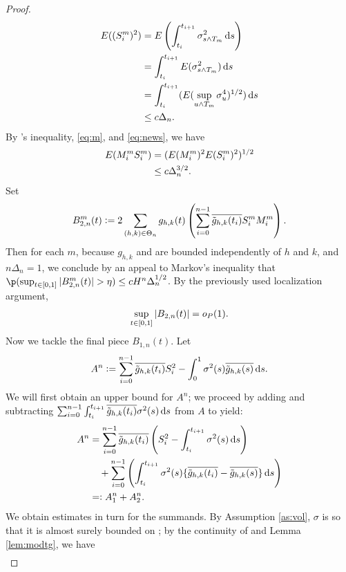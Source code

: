 \begin{proof}
\begin{align}
  E((S_i^m)^2)   & = E\left(\int_{t_i}^{t_{i+1}} \sigma^2_{s \wedge T_m} \D s \right)\notag \\
                & = \int_{t_i}^{t_{i+1}} E(\sigma^2_{s \wedge T_m}) \D s \notag \\
                & = \int_{t_i}^{t_{i+1}} (E(\sup_{u \wedge T_m} \sigma^4_{u})^{1/2}) \D s \notag \\
  & \le c \Delta_n.\label{eq:news}
\end{align}
By \holder's inequality, \eqref{eq:m}, and \eqref{eq:news},  we have
\begin{align}
  E(M_i^m S_i^m) & = (E(M_i^m)^2 E( S^m_i)^2)^{1/2} \notag\\
  & \le c\Delta_n^{3/2}.\label{eq:ms}
\end{align}
Set 
\begin{align}
 B_{2,n}^m(t) := 2 \sum_{(h,k) \in \Theta_n} g_{h,k}(t)\left(\sum_{i=0}^{n-1} \overline{\tilde{g}_{h,k}(t_i)} S_i^m M_i^m \right) \notag.
  \label{}
\end{align}
Then for each $m$,  because  $g_{h,k}$ and \tghk  are bounded independently of $h$ and $k$, and $n\Delta_n = 1$, we conclude by an appeal to Markov's inequality  that  $\p( \sup_{t \in \domain} \vert B_{2,n}^m(t)\vert > \eta) \le  c H^n \Delta_n^{1/2}$. By the previously used localization argument, 
\begin{align}
  \sup_{t\in[0,1]}\vert B_{2,n}(t)\vert = o_{P}(1).
  \label{}
\end{align}
Now we tackle the final piece $B_{1,n}(t)$. Let 
\begin{align}
  A^n  := \sum_{i=0}^{n-1}\btghki S_i^2 -\int_{0}^{1} \sigma^2(s) \btghks \D s.
\end{align}
We will first obtain an upper bound for $A^n$; we proceed by adding and subtracting $\sumin\int_{t_i}^{t_{i+1}}\btghki \sigma^2(s)  \D s$  from  $A$ to yield: 
\begin{align}
  A^n & = \sumin\btghki \left(S_i^2 -\int_{t_i}^{t_{i+1}} \sigma^2(s) \D s\right)\notag \\
  &\quad +  \sumin\left(\int_{t_i}^{t_{i+1}} \sigma^2(s) \{\btghki - \btghks\} \D s\right) \notag\\
  &=:A_{1}^n + A_{2}^n \notag.
  \label{}
\end{align}
We obtain estimates in turn for the summands. By Assumption \ref{as:vol}, $\sigma$ is \cadlag so that it is almost surely  bounded on \domain;  by the continuity of \tghk   and Lemma \eqref{lem:modtg}, we have 
\begin{align}

\end{align}
\end{proof}
